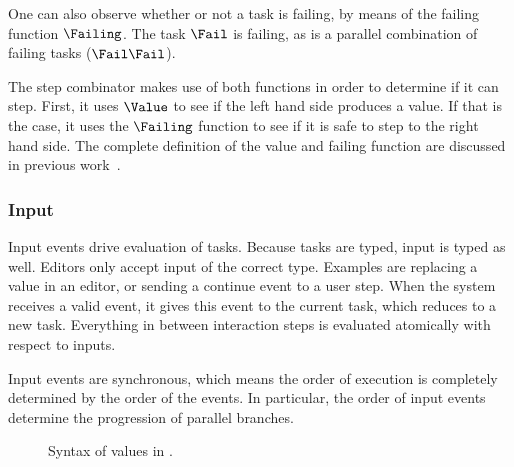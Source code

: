 One can also observe whether or not a task is failing, by means of the failing function $\Failing$.
The task $\Fail$ is failing, as is a parallel combination of failing tasks ($\Fail \And \Fail$).

The step combinator makes use of both functions in order to determine if it can step.
First, it uses $\Value$ to see if the left hand side produces a value.
If that is the case, it uses the $\Failing$ function to see if it is safe to step to the right hand side.
The complete definition of the value and failing function are discussed in previous work~\cite{Steenvoorden2019}.


\subsubsection{Input}

Input events drive evaluation of tasks.
Because tasks are typed, input is typed as well.
Editors only accept input of the correct type.
Examples are replacing a value in an editor,
or sending a continue event to a user step.
When the system receives a valid event, it gives this event to the current task, which reduces to a new task.
Everything in between interaction steps is evaluated atomically with respect to inputs.

Input events are synchronous, which means the order of execution is completely determined by the order of the events.
In particular, the order of input events determine the progression of parallel branches.



\begin{figure}[ht]
  \small
  \caption{Syntax of values in \TOPHAT.}
  \label{fig:syntaxvalues}
\end{figure}
